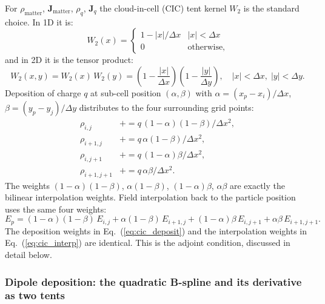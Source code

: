 \documentclass[11pt,a4paper]{article}
\newcommand{\vv}[1]{\mathbf{#1}}
\begin{document}
For $\rho_{\mathrm{matter}}$, $\vv{J}_{\mathrm{matter}}$, $\rho_q$, $\vv{J}_q$ the cloud-in-cell (CIC) tent kernel $W_2$ is the standard choice.  In 1D it is:
\begin{equation}
  W_2(x) = \begin{cases}
    1 - |x|/\Delta x & |x| < \Delta x \\
    0                & \text{otherwise,}
  \end{cases}
\end{equation}
and in 2D it is the tensor product:
\begin{equation}
  W_2(x,y) = W_2(x)\,W_2(y)
            = \left(1-\frac{|x|}{\Delta x}\right)\!\left(1-\frac{|y|}{\Delta y}\right),
  \quad |x|<\Delta x,\;|y|<\Delta y.
\end{equation}
Deposition of charge $q$ at sub-cell position $(\alpha,\beta)$ with $\alpha=(x_p-x_i)/\Delta x$, $\beta=(y_p-y_j)/\Delta y$ distributes to the four surrounding grid points:
\begin{equation}
\label{eq:cic_deposit}
\begin{aligned}
  \rho_{i,j}     &\mathrel{+}= q\,(1-\alpha)(1-\beta)/\Delta x^2, \\
  \rho_{i+1,j}   &\mathrel{+}= q\,\alpha(1-\beta)/\Delta x^2, \\
  \rho_{i,j+1}   &\mathrel{+}= q\,(1-\alpha)\beta/\Delta x^2, \\
  \rho_{i+1,j+1} &\mathrel{+}= q\,\alpha\beta/\Delta x^2.
\end{aligned}
\end{equation}
The weights $(1-\alpha)(1-\beta)$, $\alpha(1-\beta)$, $(1-\alpha)\beta$, $\alpha\beta$ are exactly the bilinear interpolation weights.  Field interpolation back to the particle position uses the same four weights:
\begin{equation}
\label{eq:cic_interp}
  E_p = (1-\alpha)(1-\beta)\,E_{i,j}
       + \alpha(1-\beta)\,E_{i+1,j}
       + (1-\alpha)\beta\,E_{i,j+1}
       + \alpha\beta\,E_{i+1,j+1}.
\end{equation}
The deposition weights in Eq.~(\ref{eq:cic_deposit}) and the interpolation weights in Eq.~(\ref{eq:cic_interp}) are identical.  This is the adjoint condition, discussed in detail below.

\subsubsection*{Dipole deposition: the quadratic B-spline and its derivative as two tents}
\end{document}
